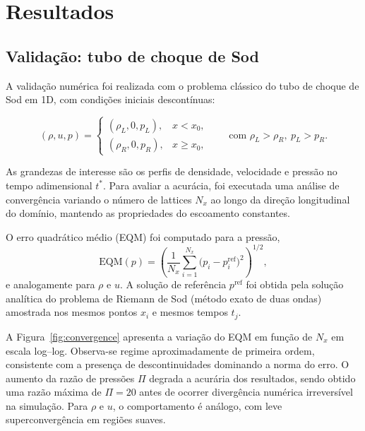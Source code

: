 
\chapter[Resultados]{Resultados}\label{ch:resultados}






\section{Validação: tubo de choque de Sod}\label{sec:validacao:-tubo-de-choque-de-sod}

A validação numérica foi realizada com o problema clássico do tubo de choque de Sod em 1D, com condições iniciais descontínuas:

\[
(\rho,u,p)=
\begin{cases}
(\rho_L,0,p_L), & x < x_0,\\
(\rho_R,0,p_R), & x \ge x_0,
\end{cases}
\qquad \text{com } \rho_L>\rho_R,\ p_L>p_R.
\]

As grandezas de interesse são os perfis de densidade, velocidade e pressão no tempo adimensional \(t^\ast\).
Para avaliar a acurácia, foi executada uma análise de convergência variando o número de lattices \(N_x\) ao longo da direção longitudinal do domínio, mantendo as propriedades do escoamento constantes.

O erro quadrático médio (EQM) foi computado para a pressão,
\[
\mathrm{EQM}(p)=\left( \frac{1}{N_x}\sum_{i=1}^{N_x}\big(p_i - p_i^{\mathrm{ref}}\big)^2 \right)^{1/2},
\]
e analogamente para \(\rho\) e \(u\).
A solução de referência \(p^{\mathrm{ref}}\) foi obtida pela solução analítica do problema de Riemann de Sod (método exato de duas ondas) amostrada nos mesmos pontos \(x_i\) e mesmos tempos \(t_j\).

A Figura~\ref{fig:convergence} apresenta a variação do EQM em função de \(N_x\) em escala log–log.
Observa-se regime aproximadamente de primeira ordem, consistente com a presença de descontinuidades dominando a norma do erro.
O aumento da razão de pressões \(\Pi\) degrada a acurária dos resultados, sendo obtido uma razão máxima de \(\Pi=20\) antes de ocorrer divergência numérica irreversível na simulação.
Para \(\rho\) e \(u\), o comportamento é análogo, com leve superconvergência em regiões suaves.

